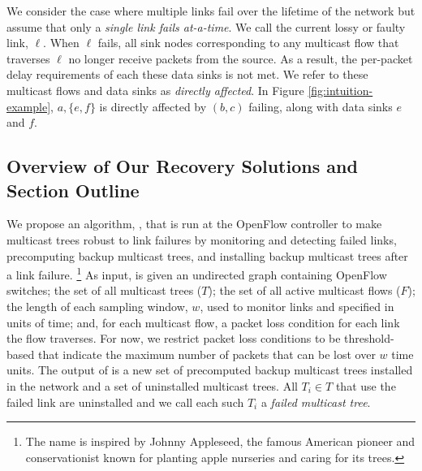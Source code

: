 We consider the case where multiple links fail over the lifetime of the network but assume that only a \emph{single link fails at-a-time}.
We call the current lossy or faulty link, $\ell$.  When $\ell$ fails, all sink nodes corresponding to any multicast flow that traverses $\ell$ no longer receive packets from the source. 
As a result, the per-packet delay requirements of each these data sinks is not met.  We refer to these multicast flows and data sinks as \emph{directly affected}.  In Figure \ref{fig:intuition-example},
$a,\{e,f\}$ is directly affected by $(b,c)$ failing, along with data sinks $e$ and $f$.



\subsection{Overview of Our Recovery Solutions and Section Outline}
\label{subsec:mdr}

We propose an algorithm, \mdrs, that is run at the OpenFlow controller to make multicast trees robust to link failures by monitoring and detecting failed links, precomputing backup multicast trees, and installing backup multicast trees after a link failure.
\footnote{The name \mdr is inspired by Johnny Appleseed, the famous American pioneer and conservationist known for planting apple nurseries and caring for its trees. }
As input, \mdr is given an undirected graph containing OpenFlow switches; the set of all multicast trees ($T$); the set of all active multicast flows ($F$); the length of each sampling window, 
$w$, used to monitor links and specified in units of time; and, for each multicast flow, a packet loss condition for each link the flow traverses. For now, we restrict packet loss conditions 
to be threshold-based that indicate the maximum number of packets that can be lost over $w$ time units. 
The output of \mdr is a new set of precomputed backup multicast trees installed in the network and a set of uninstalled multicast trees.   All $T_i \in T$ that use the failed link are uninstalled and we call each such $T_i$ a \emph{failed multicast tree}.

